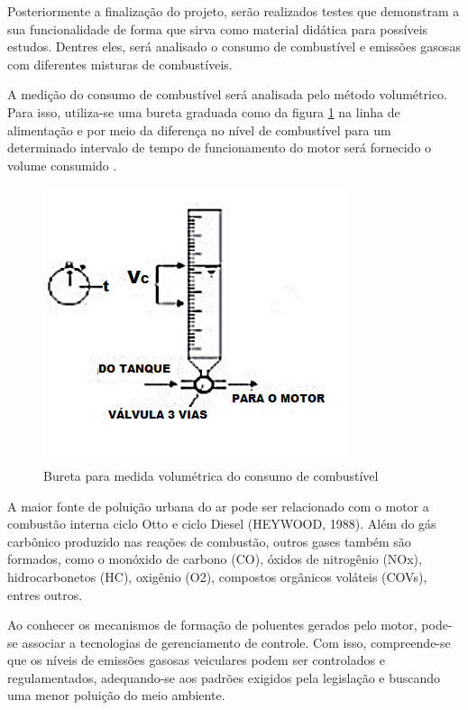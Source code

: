 Posteriormente a finalização do projeto, serão realizados testes que demonstram a sua funcionalidade de forma que sirva como material didática para possíveis estudos. Dentres eles, será analisado o consumo de combustível e emissões gasosas com diferentes misturas de combustíveis. 

A medição do consumo de combustível será analisada pelo método volumétrico. Para isso, utiliza-se uma bureta graduada como da figura \ref{buretaGraduada} na linha de alimentação e por meio da diferença no nível de combustível para um determinado intervalo de tempo de funcionamento do motor será fornecido o volume consumido \cite{perissinoto2015}.

\begin{figure}[h!]
	\centering
	\includegraphics[keepaspectratio=true,scale= 0.7]{figuras/bureta-graduada.PNG}
	\caption{Bureta para medida volumétrica do consumo de combustível}
	\label{buretaGraduada}
\end{figure}

A maior fonte de poluição urbana do ar pode ser relacionado com o motor a combustão interna ciclo Otto e ciclo Diesel (HEYWOOD, 1988). Além do gás carbônico produzido nas reações de combustão, outros gases também são formados, como  o monóxido de carbono (CO), óxidos de nitrogênio (NOx), hidrocarbonetos (HC), oxigênio (O2), compostos orgânicos voláteis (COVs), entres outros.

Ao conhecer os mecanismos de formação de poluentes gerados pelo motor, pode-se associar a tecnologias de gerenciamento de controle. Com isso, compreende-se que os níveis de emissões gasosas veiculares podem ser controlados e regulamentados, adequando-se aos padrões exigidos pela legislação e buscando uma menor poluição do meio ambiente. 

